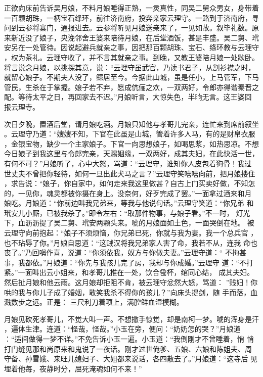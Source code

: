 正欲向床前告诉吴月娘，不料月娘睡得正熟，一灵真性，同吴二舅众男女，身带着
一百颗胡珠，一柄宝石绦环，前往济南府，投奔亲家云理守。一路到于济南府，寻
问到云参将寨门，通报进去。云参将听见月娘送亲来了，一见如故。叙毕礼数。原
来新近没了娘子，央浼邻舍王婆来陪待月娘，在后堂酒饭，甚是丰盛。吴二舅、玳
安另在一处管待。因说起避兵就亲之事，因把那百颗胡珠、宝石、绦环教与云理守
，权为茶礼。云理守收了，并不言其就亲之事。到晚，又教王婆陪月娘一处歇卧。
将言说念月娘，以挑探其意，说：“云理守虽武官，乃读书君子，从割衫襟之时，
就留心娘子。不期夫人没了，鳏居至今。今据此山城，虽是任小，上马管军，下马
管民，生杀在于掌握。娘子若不弃，愿成伉俪之欢，一双两好，令郎亦得谐秦晋之
配。等待太平之日，再回家去不迟。”月娘听言，大惊失色，半晌无言。这王婆回
报云理寺。

次日夕晚，置酒后堂，请月娘吃酒。月娘只知他与孝哥儿完亲，连忙来到席前叙坐
。云理守乃道：“嫂嫂不知，下官在此虽是山城，管着许多人马，有的是财帛衣服
，金银宝物，缺少一个主家娘子。下官一向思想娘子，如喝思浆，如热思凉。不想
今日娘子到我这里与令郎完亲，天赐姻缘，一双两好，成其夫妇，在此快活一世，
有何不可？”月娘听了，心中大怒，骂道：“云理守，谁知你人皮包着狗骨！我过
世丈夫不曾把你轻待，如何一旦出此犬马之言？”云理守笑嘻嘻向前，把月娘搂住
，求告说：“娘子，你自家中，如何走来我这里做甚？自古上门买卖好做，不知怎
的，一见你，魂灵都被你摄在身上。没奈何，好歹完成了罢。”一面拿过酒来和月
娘吃。月娘道：“你前边叫我兄弟来，等我与他说句话。”云理守笑道：“你兄弟
和玳安儿小厮，已被我杀了。”即令左右：“取那件物事，与娘子看。”不一时，
灯光下，血沥沥提了吴二舅、玳安两颗头来。唬的月娘面如土色，一面哭倒在地。
被云理守向前抱起：“娘子不须烦恼，你兄弟已死，你就与我为妻。我一个总兵官
，也不玷辱了你。”月娘自思道：“这贼汉将我兄弟家人害了命，我若不从，连我
命也丧了。”乃回嗔作喜，说道：“你须依我，奴方与你做夫妻。”云理守道：“
不拘甚事，我都依。”月娘道：“你先与我孩儿完了房，我却与你成婚。”云理守
道：“不打紧。”一面叫出云小姐来，和孝哥儿推在一处，饮合卺杯，绾同心结，
成其夫妇。然后扯月娘和他云雨。这月娘却拒阻不肯，被云理守忿然大怒，骂道：
”贱妇！你哄的我与你儿子成了婚姻，敢笑我杀不得你的孩儿？”向床头提剑，随
手而落，血溅数步之远。正是：
三尺利刀着项上，满腔鲜血湿模糊。

月娘见砍死孝哥儿，不觉大叫一声。不想撒手惊觉，却是南柯一梦。唬的浑身是汗
，遍体生津。连道：“怪哉，怪哉。”小玉在旁，便问：“奶奶怎的哭？”月娘道
：“适间做得一梦不详。”不免告诉小玉一遍。小玉道：“我倒刚才不曾睡着，悄
悄打门缝见那和尚原来和鬼说了一夜话。刚才过世俺爹、五娘、六娘和陈姐夫、周
守备、孙雪娥、来旺儿媳妇子、大姐都来说话，各四散去了。”月娘道：“这寺后
见埋着他每，夜静时分，屈死淹魂如何不来！”

